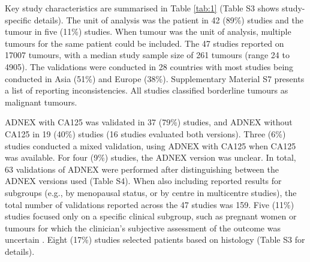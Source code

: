 Key study characteristics are summarised in Table \ref{tab:1} (Table S3 shows
study-specific details). The unit of analysis was the patient in 42 (89\%)
studies and the tumour in five (11\%) studies. When tumour was the unit of
analysis, multiple tumours for the same patient could be included. The 47
studies reported on 17007 tumours, with a median study sample size of 261
tumours (range 24 to 4905). The validations were conducted in 28 countries with
most studies being conducted in Asia (51\%) and Europe (38\%). Supplementary
Material S7 presents a list of reporting inconsistencies. All studies classified
borderline tumours as malignant tumours.



\gls{ADNEX} with CA125 was validated in 37 (79\%) studies, and \gls{ADNEX} without CA125 in
19 (40\%) studies (16 studies evaluated both versions). Three (6\%) studies
conducted a mixed validation, using \gls{ADNEX} with CA125 when CA125 was available.
For four (9\%) studies, the \gls{ADNEX} version was unclear. In total, 63 validations
of \gls{ADNEX} were performed after distinguishing between the \gls{ADNEX} versions used
(Table S4). When also including reported results for subgroups (e.g., by
menopausal status, or by centre in multicentre studies), the total number of
validations reported across the 47 studies was 159. Five (11\%) studies focused
only on a specific clinical subgroup, such as pregnant women or tumours for
which the clinician’s subjective assessment of the outcome was uncertain
 \cite{quarantaSurgeryBenignOvarian2020,
  czekierdowskiSonographicAssessmentComplex2021,
  leeUltrasonographicEvaluationOvarian2021,nohuzReliabilityIOTAScore2019,
  szubertPerformanceSelectedModels2020}.
Eight (17\%) studies selected patients based on histology (Table S3 for
details).

